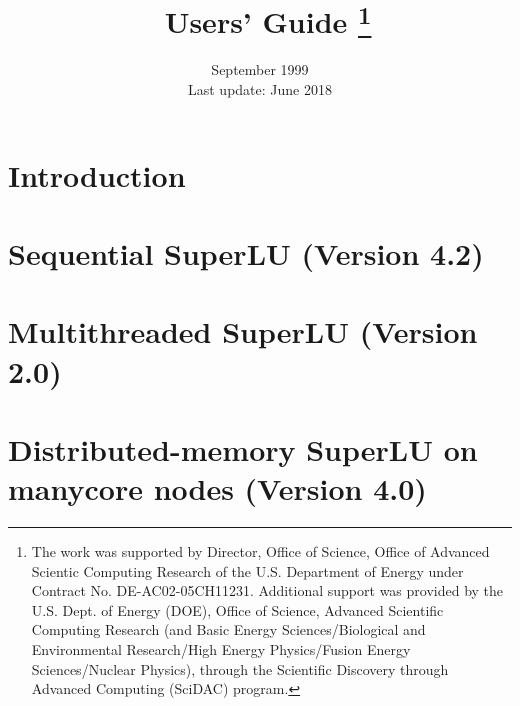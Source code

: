 \documentclass[11pt]{report}
\title{\SuperLU\ Users' Guide%
\thanks{The work was supported by Director, Office of Science,
Office of Advanced Scientic Computing Research of the U.S. Department of
Energy under Contract No. DE-AC02-05CH11231.
Additional support was provided by the U.S. Dept. of Energy (DOE), Office of Science,
Advanced Scientific Computing Research
(and Basic Energy Sciences/Biological and Environmental Research/High
Energy Physics/Fusion Energy Sciences/Nuclear Physics),
through the Scientific Discovery through Advanced Computing (SciDAC) program.}
}
\author{
  \hskip.5in\mbox{\ }
        Xiaoye S. Li%
	\thanks{
        Lawrence Berkeley National Laboratory, MS 50F-1650, 1 Cyclotron Rd,
        Berkeley, CA 94720. (xsli@lbl.gov).
	}
\and
        James W. Demmel%
        \thanks{Computer Science Division, University of California,
        Berkeley, CA 94720. (demmel@cs.berkeley.edu).
        The research of Demmel and Li was supported in part by 
        NSF grant ASC--9313958,
        DOE grant DE--FG03--94ER25219,
        UT Subcontract No.\ ORA4466 from ARPA Contract No.\ DAAL03--91--C0047,
        DOE grant DE--FG03--94ER25206,
        and
        NSF Infrastructure grants CDA--8722788 and CDA--9401156.
        }
\and
        John R. Gilbert%
        \thanks{
 	Department of Computer Science, University of California,
	 Santa Barbara, CA 93106. (gilbert@cs.ucsb.edu).
        The research of this author was supported in part by the
	Institute for Mathematics and Its Applications at the University
	of Minnesota and in part by DARPA Contract No. DABT63-95-C0087.
	Copyright $\copyright$ 1994-1997 by Xerox Corporation.
        All rights reserved.}
\and
    Laura Grigori%
    \thanks{
    INRIA Saclay-Ile de France,
    Laboratoire de Recherche en Informatique,
    Universite Paris-Sud 11. (laura.grigori@inria.fr)
    }
\and 
    Piyush Sao%
    \thanks{
      Computational Science and Engineering Division,
      Georgia Institute of Technology, Atlanta.
      (piyush3@gatech.edu).
    The research of this author was supported in part by the
    National Science Foundation CAREER award number 0953100 and
    DOE X-Stack 1.0 under DE-FC02-10ER26006/DE-SC0004915 (PI: Richard Vuduc).
    }
\and
    Meiyue Shao%
    \thanks{
      Computational Research Division,
      Lawrence Berkeley National Laboratory,
      MS 50F-1650, 1 Cyclotron Rd,
      Berkeley, CA 94720. (myshao@lbl.gov).
    }
\and
    Ichitaro Yamazaki%
    \thanks{
    Innovative Computing Laboratory,
    Department of Electrical Engineering and Computer Science,
    The University of Tennessee. (ic.yamazaki@gmail.com).
    The research of this author was supported in part by the Director,
    Office of Advanced Scientific Computing Research of the
    U.S. Department of Energy under Contract No. D-AC02-05CH11231.}
}
\date{September 1999 \\
\vspace{4mm}
Last update: June 2018}   %
\renewcommand{\thefootnote}{\fnsymbol{footnote}}
\begin{document}
\maketitle
\tableofcontents

\renewcommand{\thefootnote}{\arabic{footnote}}

\chapter{Introduction}
\label{chap:intro}


\chapter{Sequential SuperLU (Version 4.2)}
\label{chap:superlu}


\chapter{Multithreaded SuperLU (Version 2.0)}
\label{chap:superlu_mt}


\chapter{Distributed-memory SuperLU on manycore nodes (Version 4.0)}
\label{chap:superlu_dist}





%
\end{document}
